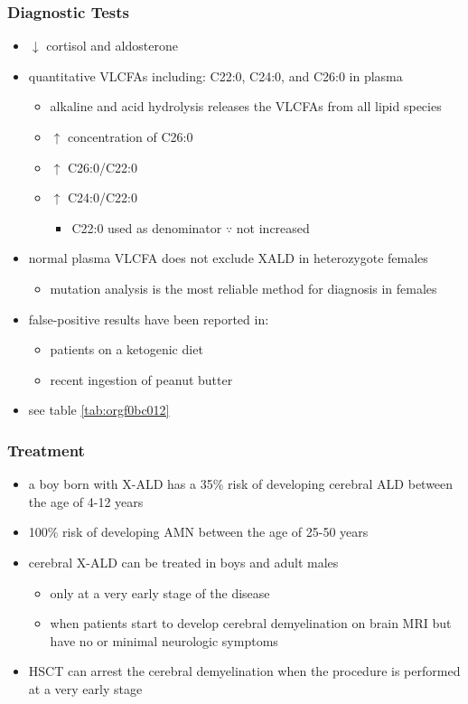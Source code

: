 \documentclass[12pt]{scrartcl}
\begin{document}
\subsubsection{Diagnostic Tests}
\label{sec:org1ef9bc5}
\begin{itemize}
\item \(\downarrow\) cortisol and aldosterone
\item quantitative VLCFAs including: C22:0, C24:0, and C26:0 in plasma
\begin{itemize}
\item alkaline and acid hydrolysis releases the VLCFAs from all lipid
species
\item \(\uparrow\) concentration of C26:0
\item \(\uparrow\) C26:0/C22:0
\item \(\uparrow\) C24:0/C22:0
\begin{itemize}
\item C22:0 used as denominator \(\because\) not increased
\end{itemize}
\end{itemize}
\item normal plasma VLCFA does not exclude XALD in heterozygote females
\begin{itemize}
\item mutation analysis is the most reliable method for diagnosis in females
\end{itemize}
\item false-positive results have been reported in:
\begin{itemize}
\item patients on a ketogenic diet
\item recent ingestion of peanut butter
\end{itemize}
\item see table \ref{tab:orgf0bc012}
\end{itemize}
\subsubsection{Treatment}
\label{sec:org4f6c07a}
\begin{itemize}
\item a boy born with X-ALD has a 35\% risk of developing cerebral ALD
between the age of 4-12 years
\item 100\% risk of developing AMN between the age of 25-50 years
\item cerebral X-ALD can be treated in boys and adult males
\begin{itemize}
\item only at a very early stage of the disease
\item when patients start to develop cerebral demyelination on brain MRI
but have no or minimal neurologic symptoms
\end{itemize}
\item HSCT can arrest the cerebral demyelination when the procedure is
performed at a very early stage
\end{itemize}
\end{document}
